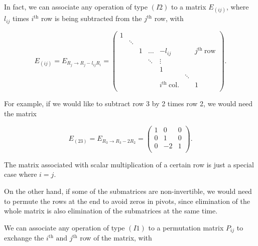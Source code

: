 \documentclass[a4paper,12pt]{report}
\begin{document}
In fact, we can associate any operation of type \((I2)\) to a matrix \(E_{(ij)} \), where \(l_{ij} \) times \(i^{\text{th}} \) row is being subtracted from the \(j^{\text{th}} \) row, with 

\begin{equation}
    E_{(ij)} = E_{R_{j} \rightarrow R_{j}-l_{ij}  R_{i}   } = \begin{pmatrix}
        1 &  &  &  &  &  &   \\
         & \ddots  &  &  &  &  &   \\
         &  & 1 & \ldots  & -l_{ij}  &  & j^{\text{th }}\text{row}   \\
         &  &  & \ddots  & \vdots  &  &   \\
         &  &  &  & 1 &  &   \\
         &  &  &  &  & \ddots  &   \\
         &  &  &  & i^{\text{th }}\text{col.}  &  & 1  \\
    \end{pmatrix}.
\end{equation}

For example, if we would like to subtract row 3 by 2 times row 2, we would need the matrix 

\begin{equation}
    E_{(23)} = E_{R_{3} \to R_{3} - 2R_{2}   } = \begin{pmatrix}
        1 & 0 &  0 \\
        0 & 1 &  0 \\
        0 & -2 & 1  \\
    \end{pmatrix}.
\end{equation}

The matrix associated with scalar multiplication of a certain row is just a special case where \(i = j\).

On the other hand, if some of the submatrices are non-invertible, we would need to permute the rows at the end to avoid zeros in pivots, since elimination of the whole matrix is also elimination of the submatrices at the same time. 

We can associate any operation of type \((I1)\) to a permutation matrix \(P_{ij} \) to exchange the \(i^{\text{th}} \text { and } j^{\text{th}} \) row of the matrix, with 
\end{document}
